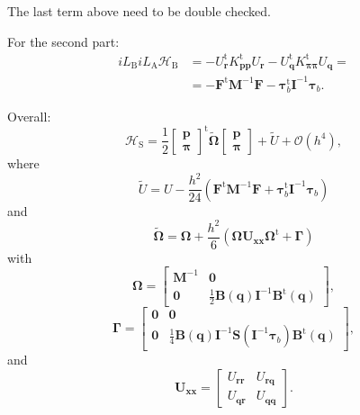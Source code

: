 \documentclass[
journal=jctcce,
layout=twocolumn
]{achemso}
\newcommand{\mt}[1]{\boldsymbol{\mathbf{#1}}}   %
\newcommand{\vt}[1]{\boldsymbol{\mathbf{#1}}}   %
\newcommand{\tr}[1]{#1^\text{t}}                %
\newcommand{\Ham}[1]{{\mathcal H}_\text{#1}}    %
\newcommand{\Liu}[1]{i\!L_\text{#1}}            %
\newcommand{\timestep}{h}
\begin{document}
The last term above need to be double checked.

For the second part:
\begin{align*}
\Liu B \Liu A \Ham B &= -\tr{U_{\vt r}} \tr{K_{\vt p \vt p}} U_{\vt r} - \tr{U_{\vt q}} \tr{K_{\vt \pi \vt \pi}} U_{\vt q} = \\
&= -\tr{\vt F} {\mt M}^{-1} {\vt F} - \tr{\vt \tau}_b {\mt I}^{-1} {\vt \tau}_b.
\end{align*}

Overall:
\begin{equation*}
\Ham S = \frac{1}{2} \tr{\left[\begin{array}{c} \vt p \\ \vt \pi \end{array}\right]} \tilde{\mt \Omega} \left[\begin{array}{c} \vt p \\ \vt \pi \end{array}\right] + \tilde{U} + \mathcal{O}({\timestep}^4),
\end{equation*}
where
\begin{equation*}
\tilde{U} = U - \frac{\timestep^2}{24} \left( \tr{\vt F} {\mt M}^{-1} {\vt F} + \tr{\vt \tau}_b {\mt I}^{-1} {\vt \tau}_b \right)
\end{equation*}
and
\begin{equation*}
\tilde{\mt \Omega} = {\mt \Omega} + \frac{\timestep^2}{6} \left( {\mt \Omega} {\mt U}_{\vt x \vt x} \tr{\mt \Omega} + {\mt \Gamma} \right)
\end{equation*}
with
\begin{equation*}
\mt \Omega = \left[\begin{array}{cc}
{\mt M}^{-1} & \mt 0 \\
\mt 0 & \frac{1}{2} {\mt B}(\vt q) {\mt I}^{-1} \tr{\mt B}(\vt q)
\end{array}\right],
\end{equation*}
\begin{equation*}
\mt \Gamma = \left[\begin{array}{cc}
\mt 0 & \mt 0 \\
\mt 0 & \frac{1}{4} {\mt B}(\vt q) {\mt I}^{-1} {\mt S}({\mt I}^{-1} {\vt \tau}_b) \tr{\mt B}(\vt q)
\end{array}\right],
\end{equation*}
and
\begin{equation*}
{\mt U}_{\vt x \vt x} = \left[\begin{array}{cc}
U_{\vt r \vt r} & U_{\vt r \vt q} \\
U_{\vt q \vt r} & U_{\vt q \vt q}
\end{array}\right].
\end{equation*}
\end{document}

